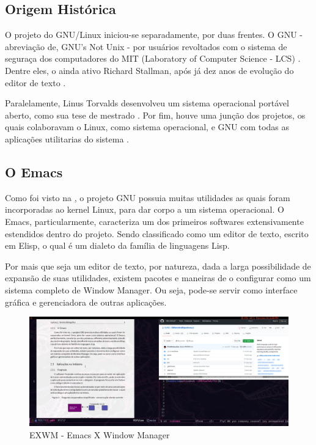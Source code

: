 \documentclass[
12pt,				%
openright,			%
oneside,			%
a4paper,			%
english,			%
french,				%
spanish,			%
brazil,				%
]{abntex2}
\begin{document}
\subsection{\label{sec:origem-linux} Origem Histórica}
O projeto do GNU/Linux iniciou-se separadamente, por duas frentes. O
GNU - abreviação de, GNU's Not Unix - por usuários revoltados com o
sistema de seguraça dos computadores do MIT (Laboratory of Computer
Science - LCS) \cite{stallman2002my,emacswiki2021history}. Dentre
eles, o ainda ativo Richard Stallman, após já dez anos de evolução do
editor de texto \cite{emacswiki2021history}.

Paralelamente, Linus Torvalds desenvolveu um sistema operacional
portável aberto, como sua tese de mestrado
\cite{torvalds1997linux}. Por fim, houve uma junção dos projetos, os
quais colaboravam o Linux, como sistema operacional, e GNU com todas
as aplicações utilitarias do sistema \cite{stallman1997}.


\subsection{O Emacs}

Como foi visto na \href{sec:origem-linux}, o projeto GNU possuia muitas utilidades as quais foram incorporadas ao kernel Linux, para dar corpo a um sistema operacional. O Emacs, particularmente, caracteriza um dos primeiros softwares extensivamente estendidos dentro do projeto. Sendo classificado como um editor de texto, escrito em Elisp, o qual é um dialeto da família de linguagens Lisp.

Por mais que seja um editor de texto, por natureza, dada a larga possibilidade de expansão de suas utilidades, existem pacotes e maneiras de o configurar como um sistema completo de Window Manager. Ou seja, pode-se servir como interface gráfica e gerenciadora de outras aplicações.

\begin{figure}[ht]
  \centering
  \caption{\label{fig:exwm1} EXWM - Emacs X Window Manager}
  \includegraphics[width=\linewidth]{exwm2.png}
\end{figure}
\end{document}
